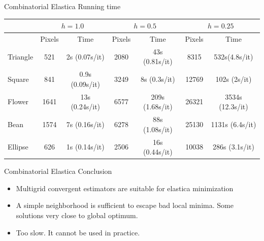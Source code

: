 \begin{frame}
{Combinatorial Elastica}
{Running time}
\begin{center}
\captionsetup{type=table}
\scriptsize
\begin{tabular}{|l|c|c|c|c|c|c|}
\hline
& \multicolumn{2}{c|}{$h=1.0$} & \multicolumn{2}{c|}{$h=0.5$} & \multicolumn{2}{c|}{$h=0.25$}\\
\hline
& Pixels & Time & Pixels & Time & Pixels & Time\\
\hline
Triangle & 521 & 2s (0.07s/it)  & 2080 & 43s (0.81s/it) & 8315 & 532s(4.8s/it)\\
{\color{highlightcolor}Square} & 841 & 0.9s (0.09s/it) & 3249 & 8s (0.3s/it) & {\color{highlightcolor}12769} & {\color{highlightcolor}102s (2s/it)}\\
{\color{highlightcolor}Flower} & 1641 & 13s (0.24s/it) & 6577 & 209s (1.68s/it) & {\color{highlightcolor}26321} & {\color{highlightcolor}3534s (12.3s/it)}\\
Bean  & 1574 & 7s (0.16s/it) & 6278 & 88s (1.08s/it) & 25130 & 1131s (6.4s/it)\\
Ellipse  & 626 & 1s (0.14s/it) & 2506 & 16s (0.44s/it) & 10038 & 286s (3.1s/it)\\
\hline
\end{tabular}
\caption{\textbf{Running time of LocalSearch.} The running times for the free elastica problem are displayed. Notice that even having a similar number of pixels, the square (bean) shape evolves much faster than the triangle (flower).}
\end{center}
\end{frame}

\begin{frame}
{Combinatorial Elastica}
{Conclusion}

\begin{itemize}
\item{Multigrid convergent estimators are suitable for elastica minimization}\\[1em]
\item{A simple neighborhood is sufficient to escape bad local minima. Some solutions very close to global optimum.}\\[1em]
\item{Too slow. It cannot be used in practice.}
\end{itemize}
\end{frame}